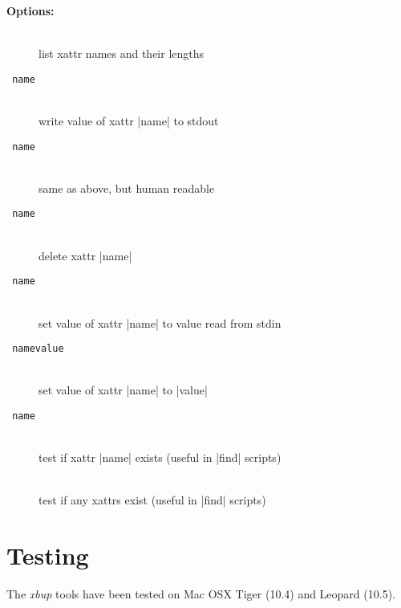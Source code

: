 \documentclass[11pt]{article}
\begin{document}
\medbreak
{\bf Options:}
\begin{description}
\item[{\tt{}}] \ \\
list xattr names and their lengths
\item[{\tt{} name}] \ \\
write value of xattr |name| to stdout
\item[{\tt{} name}] \ \\
same as above, but human readable
\item[{\tt{} name}] \ \\
delete xattr |name|
\item[{\tt{} name}] \ \\
set value of xattr |name| to value read from stdin
\item[{\tt{} name\pmb{=}value}] \ \\
set value of xattr |name| to |value|
\item[{\tt{} name}] \ \\
test if xattr |name| exists (useful in |find| scripts)
\item[{\tt{}}] \ \\
test if any xattrs exist (useful in |find| scripts)
\end{description}

\section{Testing}

The \emph{xbup} tools have been tested on Mac OSX Tiger (10.4)
and Leopard (10.5).  
\end{document}
